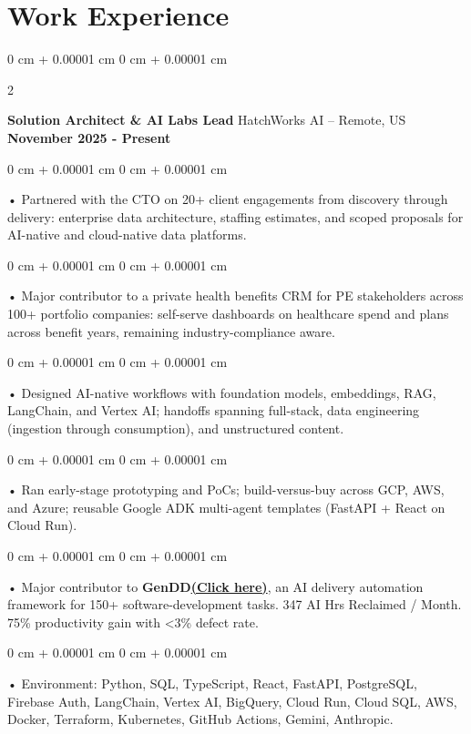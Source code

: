 \documentclass[10pt, letterpaper]{article}
\newenvironment{onecolentry}{
    \begin{adjustwidth}{
        0 cm + 0.00001 cm
    }{
        0 cm + 0.00001 cm
    }
}{
    \end{adjustwidth}
} %
\newenvironment{twocolentry}[2][]{
    \onecolentry
    \def\secondColumn{#2}
    \setcolumnwidth{\fill, 4.5 cm}
    \begin{paracol}{2}
}{
    \switchcolumn \raggedleft \secondColumn
    \end{paracol}
    \endonecolentry
} %
\begin{document}
    \vspace{0.15cm}
    \section{Work Experience}
        \vspace{0.1cm}

        \begin{twocolentry}{
            \textbf{November 2025 - Present}
        }
            \textbf{Solution Architect \& AI Labs Lead} HatchWorks AI -- Remote, US\end{twocolentry}

        \begin{onecolentry}
             • Partnered with the CTO on 20+ client engagements from discovery through delivery: enterprise data architecture, staffing estimates, and scoped proposals for AI-native and cloud-native data platforms.
        \end{onecolentry}
        \begin{onecolentry}
             • Major contributor to a private health benefits CRM for PE stakeholders across 100+ portfolio companies: self-serve dashboards on healthcare spend and plans across benefit years, remaining industry-compliance aware.
        \end{onecolentry}
        \begin{onecolentry}
             • Designed AI-native workflows with foundation models, embeddings, RAG, LangChain, and Vertex AI; handoffs spanning full-stack, data engineering (ingestion through consumption), and unstructured content.
        \end{onecolentry}
        \begin{onecolentry}
             • Ran early-stage prototyping and PoCs; build-versus-buy across GCP, AWS, and Azure; reusable Google ADK multi-agent templates (FastAPI + React on Cloud Run).
        \end{onecolentry}
        \begin{onecolentry}
             • Major contributor to \textbf{GenDD}\href{https://hatchworks.com/generative-driven-development/}{\textbf{(Click here)}}, an AI delivery automation framework for 150+ software-development tasks. 347 AI Hrs Reclaimed / Month. 75\% productivity gain with <3\% defect rate.
        \end{onecolentry}
        \begin{onecolentry}
             • Environment: Python, SQL, TypeScript, React, FastAPI, PostgreSQL, Firebase Auth, LangChain, Vertex AI, BigQuery, Cloud Run, Cloud SQL, AWS, Docker, Terraform, Kubernetes, GitHub Actions, Gemini, Anthropic.
        \end{onecolentry}
\end{document}

